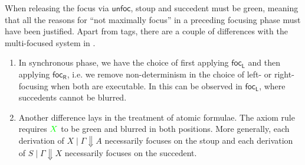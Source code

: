\documentclass[runningheads]{llncs}
\newcommand{\tr}{\otimes \mathsf{R}}
\newcommand{\lleft}{{\multimap}\mathsf{L}}
\newcommand{\pass}{\mathsf{pass}}
\newcommand{\unitl}{\mathsf{IL}}
\newcommand{\unitr}{\mathsf{IR}}
\newcommand{\otR}{\tr}
\newcommand{\lolliL}{\lleft}
\newcommand{\IL}{\unitl}
\newcommand{\IR}{\unitr}
\newcommand{\ax}{\mathsf{ax}}
\newcommand{\red}[1]{{\color{red}#1}}
\newcommand{\green}[1]{{\color{green}#1}}
\newcommand{\up}{\Uparrow}
\newcommand{\dn}{\Downarrow}
\newcommand{\focL}{\mathsf{foc_L}}
\newcommand{\focR}{\mathsf{foc_R}}
\newcommand{\blurL}{\mathsf{blur_L}}
\newcommand{\unfoc}{\mathsf{unfoc}}
\begin{document}
When releasing the focus via $\unfoc$, stoup and succedent must be green, meaning that all the reasons for ``not maximally focus'' in a preceding focusing phase must have been justified. Apart from tags, there are a couple of differences with the multi-focused system in .
\begin{enumerate}
  \item In synchronous phase, we have the choice of first applying $\focL$ and then applying $\focR$, i.e. we remove non-determinism in the choice of left- or right-focusing when both are executable. In  this can be observed in $\focL$, where succedents cannot be blurred. %
\item Another difference lays in the treatment of atomic formulae. The axiom rule requires $\green{X}$ to be green and blurred in both positions. More generally, %
each derivation of $X \mid \Gamma \dn A$ necessarily focuses on the stoup and each derivation of $S \mid \Gamma \dn X$ necessarily focuses on the succedent.
\end{enumerate}
\end{document}
